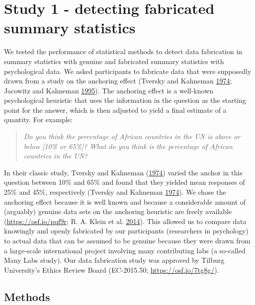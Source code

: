 \documentclass[a5paper]{book}
\begin{document}
\section{Study 1 - detecting fabricated summary
statistics}\label{study-1---detecting-fabricated-summary-statistics}

We tested the performance of statistical methods to detect data
fabrication in summary statistics with genuine and fabricated summary
statistics with psychological data. We asked participants to fabricate
data that were supposedly drawn from a study on the anchoring effect
(Tversky and Kahneman
\protect\hyperlink{ref-doi:10.1126ux2fscience.185.4157.1124}{1974};
Jacowitz and Kahneman
\protect\hyperlink{ref-doi:10.1037ux2fe722982011-058}{1995}). The
anchoring effect is a well-known psychological heuristic that uses the
information in the question as the starting point for the answer, which
is then adjusted to yield a final estimate of a quantity. For example:

\begin{quote}
\emph{Do you think the percentage of African countries in the UN is
above or below {[}10\% or 65\%{]}? What do you think is the percentage
of African countries in the UN?}
\end{quote}

In their classic study, Tversky and Kahneman
(\protect\hyperlink{ref-doi:10.1126ux2fscience.185.4157.1124}{1974})
varied the anchor in this question between 10\% and 65\% and found that
they yielded mean responses of 25\% and 45\%, respectively (Tversky and
Kahneman
\protect\hyperlink{ref-doi:10.1126ux2fscience.185.4157.1124}{1974}). We
chose the anchoring effect because it is well known and because a
considerable amount of (arguably) genuine data sets on the anchoring
heuristic are freely available (\url{https://osf.io/pqf9r}; R. A. Klein
et al.
\protect\hyperlink{ref-doi:10.1027ux2f1864-9335ux2fa000178}{2014}). This
allowed us to compare data knowingly and openly fabricated by our
participants (researchers in psychology) to actual data that can be
assumed to be genuine because they were drawn from a large-scale
international project involving many contributing labs (a so-called Many
Labs study). Our data fabrication study was approved by Tilburg
University's Ethics Review Board (EC-2015.50;
\url{https://osf.io/7tg8g/}).

\subsection{Methods}\label{methods-2}
\end{document}

